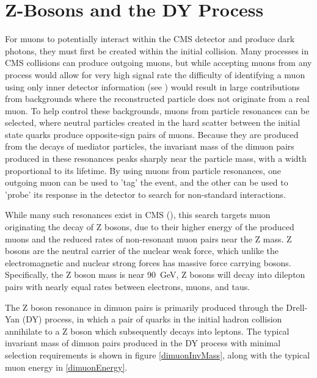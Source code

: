 \section{Z-Bosons and the DY Process}
For muons to potentially interact within the CMS detector and produce dark photons, they must first be created within the initial collision.
Many processes in CMS collisions can produce outgoing muons, but while accepting muons from any process would allow for very high signal rate the difficulty of identifying a muon using only inner detector information (see ) would result in large contributions from backgrounds where the reconstructed particle does not originate from a real muon.
To help control these backgrounds, muons from particle resonances can be selected, where neutral particles created in the hard scatter between the initial state quarks produce opposite-sign pairs of muons.
Because they are produced from the decays of mediator particles, the invariant mass of the dimuon pairs produced in these resonances peaks sharply near the particle mass, with a width proportional to its lifetime. 
By using muons from particle resonances, one outgoing muon can be used to 'tag' the event, and the other can be used to 'probe' its response in the detector to search for non-standard interactions. 

While many such resonances exist in CMS (), this search targets muon originating the decay of Z bosons, due to their higher energy of the produced muons and the reduced rates of non-resonant muon pairs near the Z mass.
Z bosons are the neutral carrier of the nuclear weak force, which unlike the electromagnetic and nuclear strong forces has massive force carrying bosons.
Specifically, the Z boson mass is near \SI{90}{\giga\eV}, 
Z bosons will decay into dilepton pairs with nearly equal rates between electrons, muons, and taus. 

The Z boson resonance in dimuon pairs is primarily produced through the Drell-Yan (DY) process, in which a pair of quarks in the initial hadron collision annihilate to a Z boson which subsequently decays into leptons.
The typical invariant mass of dimuon pairs produced in the DY process with minimal selection requirements is shown in figure \ref{dimuonInvMass}, along with the typical muon energy in \ref{dimuonEnergy}.

